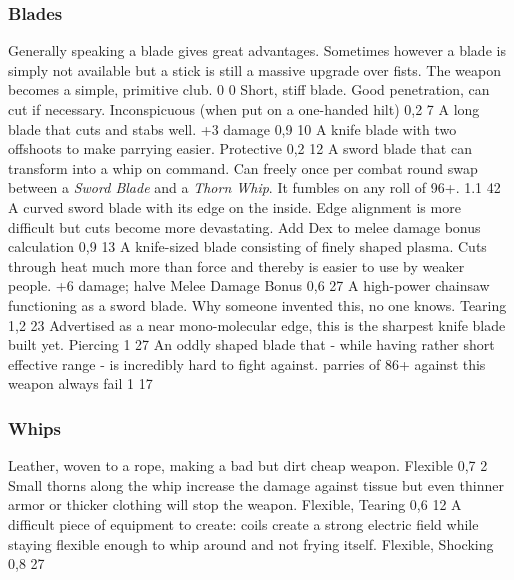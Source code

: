\subsubsection{Blades}
\vspace{8mm}
\begin{multicols}{2}
    {Generally speaking a blade gives great advantages.
        Sometimes however a blade is simply not available but a stick is still a massive upgrade over fists.}
    {The weapon becomes a simple, primitive club.}
    {0}
    {0}
    {}
    {Short, stiff blade. Good penetration, can cut if necessary.}
    {
    	Inconspicuous (when put on a one-handed hilt)
	}{0,2}
    {7}
    {}
    {A long blade that cuts and stabs well.}
    {+3 damage}
    {0,9}
    {10}
    {}
    {A knife blade with two offshoots to make parrying easier.}
    {Protective}
    {0,2}
    {12}
    {}
	{A sword blade that can transform into a whip on command.}
	{
		Can freely once per combat
		round swap between a \emph{Sword Blade} and a \emph{Thorn Whip}.
		It fumbles on any roll of 96+.
	}
	{1.1}
	{42}
	{}
    {A curved sword blade with its edge on the inside.
        Edge alignment is more difficult but cuts become more devastating.}
    {Add Dex to melee damage bonus calculation}
    {0,9}
    {13}
    {}
    {A knife-sized blade consisting of finely shaped plasma.
        Cuts through heat much more than force and thereby is easier to use by weaker people.}
    {+6 damage; halve Melee Damage Bonus}
    {0,6}
    {27}
    {}
    {A high-power chainsaw functioning as a sword blade.
        Why someone invented this, no one knows.}
    {Tearing}
    {1,2}
    {23}
    {}
    {Advertised as a near mono-molecular edge,
        this is the sharpest knife blade built yet.}
    {Piercing}
    {1}
    {27}
    {}
    {An oddly shaped blade that
        - while having rather short effective range
        - is incredibly hard to fight against.}
    {parries of 86+ against this weapon always fail}
    {1}
    {17}
    {}
\end{multicols}

\subsubsection{Whips}
\vspace{8mm}
\begin{multicols}{2}
    {Leather, woven to a rope, making a bad but dirt cheap weapon.}
    {Flexible}
    {0,7}
    {2}
    {}
    {Small thorns along the whip increase the damage against tissue
        but even thinner armor or thicker clothing will stop the weapon.}
    {Flexible, Tearing}
    {0,6}
    {12}
    {}
    {A difficult piece of equipment to create:
        coils create a strong electric field while staying flexible enough to whip around
        and not frying itself.}
    {Flexible, Shocking}
    {0,8}
    {27}
    {}
\end{multicols}

